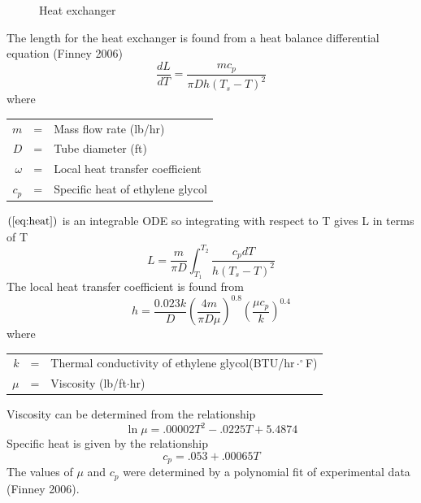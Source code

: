 \documentclass[titlepage,11pt]{article}
\begin{document}
\begin{figure}[h]\label{fig:exchanger}
\begin{center}
 \caption{Heat
exchanger}
\end{center}
\end{figure}
\noindent The length for the heat exchanger is found from a heat
balance differential equation (Finney 2006)
\begin{equation}\label{eq:heat}
\frac{dL}{dT}=\frac{m c_p}{\pi D h (T_s-T)^2}
\end{equation}
where
\begin{singlespacing}
\begin{center}
\begin{tabular}{rcl}
$m$&=&Mass flow rate (lb/hr)\\
$D$&=&Tube diameter (ft)\\
$\omega$ &=&Local heat transfer coefficient\\
$c_p$ &=&Specific heat of ethylene glycol
\end{tabular}
\end{center}
\end{singlespacing}
\noindent $\left(\ref{eq:heat}\right)$ is an integrable ODE so
integrating with respect to T gives L in terms of T
\begin{equation}\label{eq:int}
L=\frac{m }{\pi D}\int^{T_2}_{T_1}{\frac{c_p dT}{h (T_s-T)^2}}
\end{equation}
The local heat transfer coefficient is found from
\begin{equation}
h=\frac{0.023k}{D}\left(\frac{4m}{\pi D
\mu}\right)^{0.8}\left(\frac{\mu c_p}{k}\right)^{0.4}
\end{equation}
where
\begin{singlespacing}
\begin{center}
\begin{tabular}{rcl}
$k$&=&Thermal conductivity of ethylene glycol(BTU/hr$\cdot^\circ$F)\\
$\mu$&=&Viscosity (lb/ft$\cdot$hr)\\
\end{tabular}
\end{center}
\end{singlespacing}
Viscosity can be determined from the relationship
\begin{equation}
\ln{\mu}=.00002T^2-.0225T+5.4874
\end{equation}
Specific heat is given by the relationship
\begin{equation}
c_p=.053 + .00065T
\end{equation}
The values of $\mu$ and $c_p$ were determined by a polynomial fit of
experimental data (Finney 2006).
\end{document}
